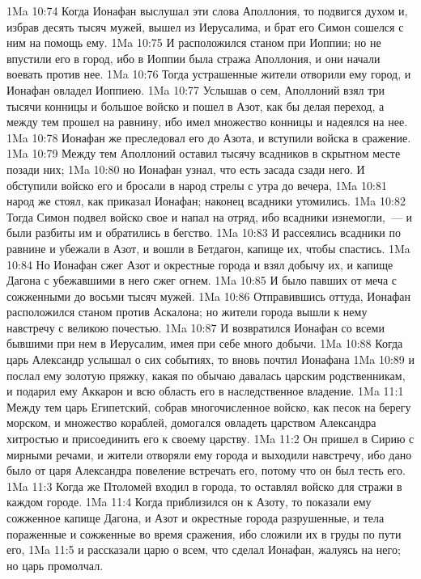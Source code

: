 \vs 1Ma 10:74 Когда Ионафан выслушал эти слова Аполлония, то подвигся духом и, избрав десять тысяч мужей, вышел из Иерусалима, и брат его Симон сошелся с ним на помощь ему.
\vs 1Ma 10:75 И расположился станом при Иоппии; но не впустили его в город, ибо в Иоппии была стража Аполлония, и они начали воевать против нее.
\vs 1Ma 10:76 Тогда устрашенные жители отворили ему город, и Ионафан овладел Иоппиею.
\vs 1Ma 10:77 Услышав о сем, Аполлоний взял три тысячи конницы и большое войско и пошел в Азот, как бы делая переход, а между тем прошел на равнину, ибо имел множество конницы и надеялся на нее.
\vs 1Ma 10:78 Ионафан же преследовал его до Азота, и вступили войска в сражение.
\vs 1Ma 10:79 Между тем Аполлоний оставил тысячу всадников в скрытном месте позади них;
\vs 1Ma 10:80 но Ионафан узнал, что есть засада сзади него. И обступили войско его и бросали в народ стрелы с утра до вечера,
\vs 1Ma 10:81 народ же стоял, как приказал Ионафан; наконец всадники утомились.
\vs 1Ma 10:82 Тогда Симон подвел войско свое и напал на отряд, ибо всадники изнемогли,~--- и были разбиты им и обратились в бегство.
\vs 1Ma 10:83 И рассеялись всадники по равнине и убежали в Азот, и вошли в Бетдагон, капище их, чтобы спастись.
\vs 1Ma 10:84 Но Ионафан сжег Азот и окрестные города и взял добычу их, и капище Дагона с убежавшими в него сжег огнем.
\vs 1Ma 10:85 И было павших от меча с сожженными до восьми тысяч мужей.
\vs 1Ma 10:86 Отправившись оттуда, Ионафан расположился станом против Аскалона; но жители города вышли к нему навстречу с великою почестью.
\vs 1Ma 10:87 И возвратился Ионафан со всеми бывшими при нем в Иерусалим, имея при себе много добычи.
\vs 1Ma 10:88 Когда царь Александр услышал о сих событиях, то вновь почтил Ионафана
\vs 1Ma 10:89 и послал ему золотую пряжку, какая по обычаю давалась царским родственникам, и подарил ему Аккарон и всю область его в наследственное владение.
\vs 1Ma 11:1 Между тем царь Египетский, собрав многочисленное войско, как песок на берегу морском, и множество кораблей, домогался овладеть царством Александра хитростью и присоединить его к своему царству.
\vs 1Ma 11:2 Он пришел в Сирию с мирными речами, и жители отворяли ему города и выходили навстречу, ибо дано было от царя Александра повеление встречать его, потому что он был тесть его.
\vs 1Ma 11:3 Когда же Птоломей входил в города, то оставлял войско для стражи в каждом городе.
\vs 1Ma 11:4 Когда приблизился он к Азоту, то показали ему сожженное капище Дагона, и Азот и окрестные города разрушенные, и тела пораженные и сожженные во время сражения, ибо сложили их в груды по пути его,
\vs 1Ma 11:5 и рассказали царю о всем, что сделал Ионафан, жалуясь на него; но царь промолчал.
